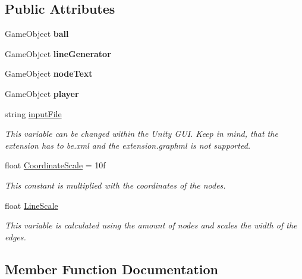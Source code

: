 \subsection*{Public Attributes}
\begin{DoxyCompactItemize}
\item 
\mbox{\label{class_graph_drawer_a8126f350e34da05796424c5794935b31}} 
Game\+Object {\bfseries ball}
\item 
\mbox{\label{class_graph_drawer_a50b22b89dca27e868e269266de9aa2a3}} 
Game\+Object {\bfseries line\+Generator}
\item 
\mbox{\label{class_graph_drawer_ab66ad8d286ed137049bf07ef1d3c6f45}} 
Game\+Object {\bfseries node\+Text}
\item 
\mbox{\label{class_graph_drawer_a271926d8a025465e75950519199a8fa7}} 
Game\+Object {\bfseries player}
\item 
string \mbox{\hyperlink{class_graph_drawer_a1264583a4ab9461d51c53c78ca12c5fa}{input\+File}}
\begin{DoxyCompactList}\small\item\em This variable can be changed within the Unity G\+UI. Keep in mind, that the extension has to be.\+xml and the extension.\+graphml is not supported. \end{DoxyCompactList}\item 
float \mbox{\hyperlink{class_graph_drawer_a0a09edfeab5c988ee4ed2e335b0897e7}{Coordinate\+Scale}} = 10f
\begin{DoxyCompactList}\small\item\em This constant is multiplied with the coordinates of the nodes. \end{DoxyCompactList}\item 
float \mbox{\hyperlink{class_graph_drawer_aa5ef4a330d302c0d55a33376a4727edf}{Line\+Scale}}
\begin{DoxyCompactList}\small\item\em This variable is calculated using the amount of nodes and scales the width of the edges. \end{DoxyCompactList}\end{DoxyCompactItemize}


\subsection{Member Function Documentation}
\mbox{\label{class_graph_drawer_ad4bde4b9d817629c77bc1e8818e5cd69}} 
